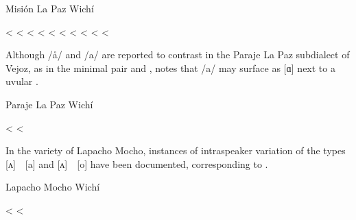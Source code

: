 \ea \label{wi-ao-a-mlp}
Misión La Paz Wichí \citep{MA08}\\
    \begin{xlist}
        \ex {} <  \label{wi-ao-a-mlp-aloja}
        \ex {} < 
        \ex {} < 
        \ex {} <  \label{wi-ao-a-mlp-horsefly}
        \ex {} <  \label{wi-ao-a-mlp-word}
        \ex {} <  \label{wi-ao-a-mlp-pepper}
        \ex {} <  \label{wi-ao-a-mlp-ax}
        \ex {} < 
        \ex {} < 
        \ex {} <  \label{wi-ao-a-mlp-rope}
    \end{xlist}
\z
{}

Although /å/ and /a/ are reported to contrast in the Paraje La Paz subdialect of Vejoz, as in the minimal pair  and , \citet{AFG067} notes that /a/ may surface as [ɑ] next to a uvular .

\ea \label{wi-ao-a-plp}
Paraje La Paz Wichí \citep{AFG067}\\
    \begin{xlist}
        \ex {} < 
        \ex {} < 
    \end{xlist}
\z

In the variety of Lapacho Mocho, instances of intraspeaker variation of the types [ʌ]~\recind~[a]  and [ʌ]~\recind~[o]  have been documented, corresponding to  \citep[164]{AFG-SS-09}.

\ea
Lapacho Mocho Wichí \citep[164]{AFG-SS-09}\\
    \begin{xlist}
        \ex {} \recind {} <  \label{wi-ao-a-lm-tail}
        \ex {} \recind {} <  \label{wi-ao-a-lm-clay}
    \end{xlist}
\z
{}

